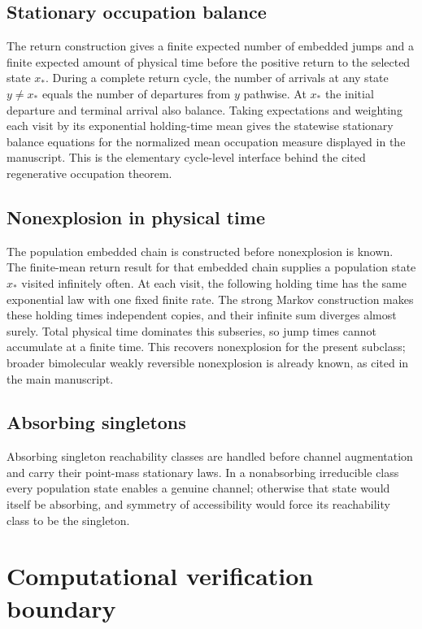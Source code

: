 \documentclass[10pt]{article}
\begin{document}
\subsection{Stationary occupation balance}

The return construction gives a finite expected number of embedded jumps and
a finite expected amount of physical time before the positive return to the
selected state $x_*$.  During a complete return cycle, the number of arrivals
at any state $y\ne x_*$ equals the number of departures from $y$ pathwise.  At
$x_*$ the initial departure and terminal arrival also balance.  Taking
expectations and weighting each visit by its exponential holding-time mean
gives the statewise stationary balance equations for the normalized mean
occupation measure displayed in the manuscript.  This is the elementary
cycle-level interface behind the cited regenerative occupation theorem.

\subsection{Nonexplosion in physical time}

The population embedded chain is constructed before nonexplosion is known.
The finite-mean return result for that embedded chain supplies a population
state $x_*$ visited infinitely often.  At each visit, the following holding time has the same exponential law
with one fixed finite rate.  The strong Markov construction makes these
holding times independent copies, and their infinite sum diverges almost
surely.  Total physical time dominates this subseries, so jump times cannot
accumulate at a finite time.  This recovers nonexplosion for the present
subclass; broader bimolecular weakly reversible nonexplosion is already known,
as cited in the main manuscript.

\subsection{Absorbing singletons}

Absorbing singleton reachability classes are handled before channel
augmentation and carry their point-mass stationary laws.  In a nonabsorbing
irreducible class every population state enables a genuine channel; otherwise
that state would itself be absorbing, and symmetry of accessibility would
force its reachability class to be the singleton.

\section{Computational verification boundary}
\end{document}

